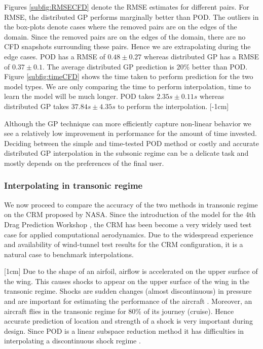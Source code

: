 Figures \ref{subfig:RMSECFD} denote the RMSE estimates for different pairs. For RMSE, the distributed GP performs marginally better than POD. The outliers in the box-plots denote cases where the removed pairs are on the edges of the domain. Since the removed pairs are on the edges of the domain, there are no CFD snapshots surrounding these pairs. Hence we are extrapolating during the edge cases. POD has a RMSE of $0.48\pm0.27$ whereas distributed GP has a RMSE of $0.37\pm0.1$. The average distributed GP prediction is $20\%$ better than POD. Figure \ref{subfig:timeCFD} shows the time taken to perform prediction for the two model types. We are only comparing the time to perform interpolation, time to learn the model will be much longer. POD takes $2.35s\pm0.11s$ whereas distributed GP takes $37.84s\pm4.35s$ to perform the interpolation.  
[-1cm]

Although the GP technique can more efficiently capture non-linear behavior we see a relatively low improvement in performance for the amount of time invested. Deciding between the simple and time-tested POD method or costly and accurate distributed GP interpolation in the subsonic regime can be a delicate task and mostly depends on the preferences of the final user.

\subsubsection{Interpolating in transonic regime}\label{subSec:resultsCRM}
We now proceed to compare the accuracy of the two methods in transonic regime on the CRM proposed by NASA. Since the introduction of the model for the 4th Drag Prediction Workshop \cite{vassberg2014summary}, the CRM has been become a very widely used test case for applied computational aerodynamics. Due to the widespread experience and availability of wind-tunnel test results for the CRM configuration, it is a natural case to benchmark interpolations. 

[1cm]
Due to the shape of an airfoil, airflow is accelerated on the upper surface of the wing. This causes shocks to appear on the upper surface of the wing in the transonic regime. Shocks are sudden changes (almost discontinuous) in pressure and are important for estimating the performance of the aircraft \cite{jameson1974iterative, cole2012transonic}. Moreover, an aircraft flies in the transonic regime for 80\% of its journey (cruise). Hence accurate prediction of location and strength of a shock is very important during design. Since POD is a linear subspace reduction method it has difficulties in interpolating a discontinuous shock regime \cite{verveld2016reduced}.

